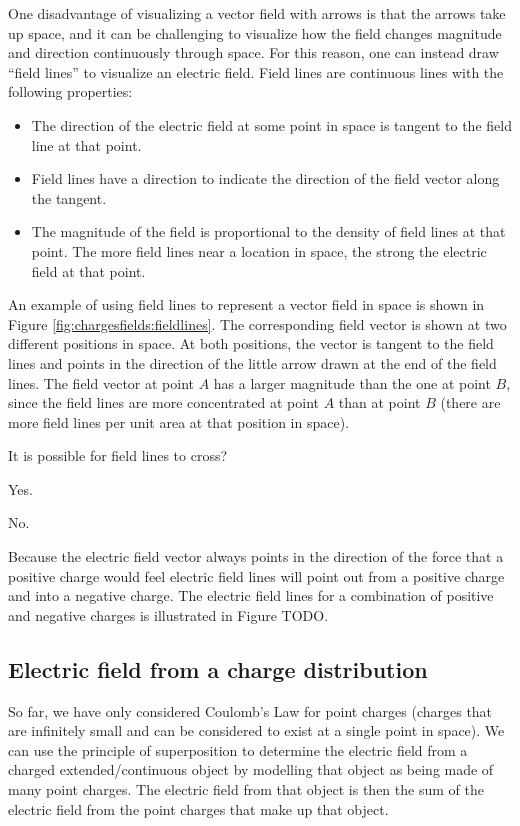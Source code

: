 One disadvantage of visualizing a vector field with arrows is that the arrows take up space, and it can be challenging to visualize how the field changes magnitude and direction continuously through space. For this reason, one can instead draw ``field lines'' to visualize an electric field. Field lines are continuous lines with the following properties:
\begin{itemize}
\item The direction of the electric field at some point in space is tangent to the field line at that point.
\item Field lines have a direction to indicate the direction of the field vector along the tangent.
\item The magnitude of the field is proportional to the density of field lines at that point. The more field lines near a location in space, the strong the electric field at that point.
\end{itemize}
An example of using field lines to represent a vector field in space is shown in Figure \ref{fig:chargesfields:fieldlines}. The corresponding field vector is shown at two different positions in space. At both positions, the vector is tangent to the field lines and points in the direction of the little arrow drawn at the end of the field lines. The field vector at point $A$ has a larger magnitude than the one at point $B$, since the field lines are more concentrated at point $A$ than at point $B$ (there are more field lines per unit area at that position in space).
\begin{checkpoint}\label{cp:chargesfields:efield}
\begin{MCquestion}{It is possible for field lines to cross?}
\item Yes.
\item No. \correct
\end{MCquestion}
\end{checkpoint}
Because the electric field vector always points in the direction of the force that a positive charge would feel electric field lines will point out from a positive charge and into a negative charge. The electric field lines for a combination of positive and negative charges is illustrated in Figure TODO.

\subsection{Electric field from a charge distribution}
So far, we have only considered Coulomb's Law for point charges (charges that are infinitely small and can be considered to exist at a single point in space). We can use the principle of superposition to determine the electric field from a charged extended/continuous object by modelling that object as being made of many point charges. The electric field from that object is then the sum of the electric field from the point charges that make up that object. 

